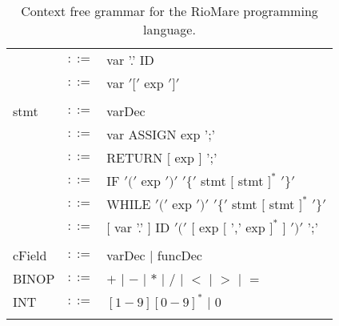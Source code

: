 \documentclass{article}
\begin{document}
\begin{table}[h]
\begin{tabular}{ l c l }
         & $::=$ & var '.' ID          \\
         & $::=$ & var $'['$ exp $']'$ \\
\\  
stmt     & $::=$ & varDec                                                             \\
         & $::=$ & var ASSIGN exp ';'                                                 \\
         & $::=$ & RETURN $[$ exp $]$ ';'                                             \\
         & $::=$ & IF $'('$ exp $')'$ $'\{'$ stmt $[$ stmt $]^{*}$ $'\}'$             \\
         & $::=$ & WHILE $'('$ exp $')'$ $'\{'$ stmt $[$ stmt $]^{*}$ $'\}'$          \\
         & $::=$ & $[$ var '.' $]$ ID $'('$ $[$ exp $[$ ',' exp $]^{*}$ $]$ $')'$ ';' \\
\\
cField   & $::=$ & varDec $|$ funcDec \\
BINOP    & $::=$ & $+$ $|$ $-$ $|$ $*$ $|$ $/$ $|$ $<$ $|$ $>$ $|$ $=$ \\
INT      & $::=$ & $[1-9][0-9]^{*}$ $|$ $0$                            \\
\\
\end{tabular}
\caption{
Context free grammar for the RioMare programming language.
\label{Table_CFG_Of_RioMare}}
\end{table}
\end{document}
